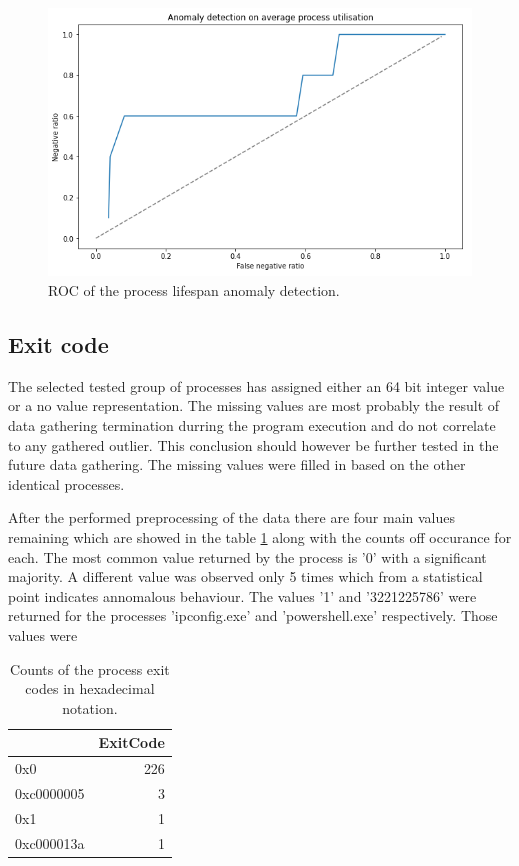 \documentclass[a4paper,twoside,12pt]{book}
\begin{document}
\begin{figure}
	\centering
	\includegraphics[scale=0.9]{images/ROClifespan.PNG}
	\caption{ROC of the process lifespan anomaly detection.}
	\label{fig:lifespanROC}
 \end{figure}

\subsection{Exit code}

The selected tested group of processes has assigned either an 64 bit integer value or a no value representation.
The missing values are most probably the result of data gathering termination durring the program execution and
do not correlate to any gathered outlier. This conclusion should however be further tested in the future data gathering.
The missing values were filled in based on the other identical processes.

After the performed preprocessing of the data there are four main values remaining which are showed in the table \ref{id:tab:exitCodeCounts}
along with the counts off occurance for each. The most common value returned by the process is '0' with a significant majority. A different 
value was observed only 5 times which from a statistical point indicates annomalous behaviour. The values '1' and '3221225786' were
returned for the processes 'ipconfig.exe' and 'powershell.exe' respectively. Those values were %

\begin{table}
	\centering
	\caption{Counts of the process exit codes in hexadecimal notation.}
	\label{id:tab:exitCodeCounts}
	\begin{tabular}{lr}
		\toprule
		{} &  ExitCode \\
		\midrule
		0x0        &       226 \\
		0xc0000005 &         3 \\
		0x1        &         1 \\
		0xc000013a &         1 \\
		\bottomrule
	\end{tabular}		
\end{table}
\end{document}
